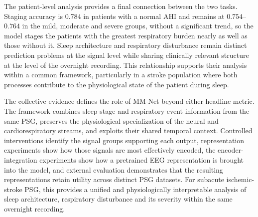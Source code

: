 \documentclass{ieeeaccess}
\begin{document}
The patient-level analysis provides a final connection between the two tasks.
Staging accuracy is $0.784$ in patients with a normal AHI and remains at $0.754$--$0.764$ in
the mild, moderate and severe groups, without a significant trend, so the model stages the
patients with the greatest respiratory burden nearly as well as those without it. Sleep
architecture and respiratory disturbance remain distinct prediction problems at the signal
level while sharing clinically relevant structure at the level of the overnight recording.
This relationship supports their analysis within a common framework, particularly in a stroke
population where both processes contribute to the physiological state of the patient during
sleep.

The collective evidence defines the role of MM-Net beyond either headline
metric. The framework combines sleep-stage and respiratory-event information
from the same PSG, preserves the physiological specialization of the neural and
cardiorespiratory streams, and exploits their shared temporal context.
Controlled interventions identify the signal groups supporting each output,
representation experiments show how those signals are most effectively encoded,
the encoder-integration experiments show how a pretrained EEG representation is brought into
the model, and external evaluation demonstrates that the resulting representations retain
utility across distinct PSG datasets. For subacute ischemic-stroke PSG, this
provides a unified and physiologically interpretable analysis of sleep
architecture, respiratory disturbance and its severity within the same overnight recording.

\end{document}
